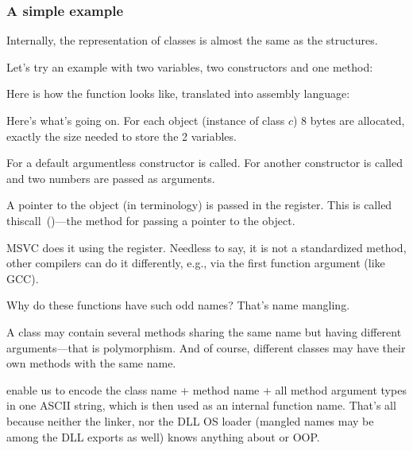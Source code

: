 \subsubsection{A simple example}

Internally, the representation of \Cpp classes is almost the same as the structures.

Let's try an example with two variables, two constructors and one method:




Here is how the \main function looks like, translated 
into assembly language:



Here's what's going on.
For each object (instance of class $c$) 8 bytes are allocated,
exactly the size needed to store the 2 variables.

For  a default argumentless constructor  is called.
For  another constructor  is called and two numbers are passed as arguments.

\label{thiscall}

A pointer to the object (\ITthis in \Cpp terminology) is passed in the \ECX register.
This is called thiscall~()---the method for passing a pointer to the object.

MSVC does it using the \ECX register. Needless to say, it is not a standardized method, other compilers can do it
differently, e.g., via the first function argument (like GCC).

\label{namemangling}

Why do these functions have such odd names?
That's \gls{name mangling}.

A \Cpp class may contain several methods sharing the same name but having different 
arguments---that is polymorphism.
And of course, different classes may have their own methods with the same name.


 enable us to encode the class name + method name + all method argument types
in one ASCII string, which is then used as an internal function name.
That's all because neither the linker, nor the DLL \ac{OS} loader (mangled names may be among 
the DLL exports as well) knows anything about \Cpp or \ac{OOP}.

